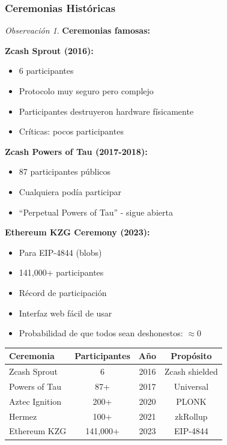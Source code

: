 \documentclass[11pt,a4paper,twoside,openright]{book}
\theoremstyle{definition}
\theoremstyle{plain}
\theoremstyle{remark}
\newtheorem{remark}{Observación}[chapter]
\begin{document}
\subsubsection{Ceremonias Históricas}

\begin{remark}
\textbf{Ceremonias famosas:}

\textbf{Zcash Sprout (2016):}
\begin{itemize}
    \item 6 participantes
    \item Protocolo muy seguro pero complejo
    \item Participantes destruyeron hardware físicamente
    \item Críticas: pocos participantes
\end{itemize}

\textbf{Zcash Powers of Tau (2017-2018):}
\begin{itemize}
    \item 87 participantes públicos
    \item Cualquiera podía participar
    \item ``Perpetual Powers of Tau'' - sigue abierta
\end{itemize}

\textbf{Ethereum KZG Ceremony (2023):}
\begin{itemize}
    \item Para EIP-4844 (blobs)
    \item 141,000+ participantes
    \item Récord de participación
    \item Interfaz web fácil de usar
    \item Probabilidad de que todos sean deshonestos: $\approx 0$
\end{itemize}

\begin{center}
\begin{tabular}{lccc}
\toprule
\textbf{Ceremonia} & \textbf{Participantes} & \textbf{Año} & \textbf{Propósito} \\
\midrule
Zcash Sprout & 6 & 2016 & Zcash shielded \\
Powers of Tau & 87+ & 2017 & Universal \\
Aztec Ignition & 200+ & 2020 & PLONK \\
Hermez & 100+ & 2021 & zkRollup \\
Ethereum KZG & 141,000+ & 2023 & EIP-4844 \\
\bottomrule
\end{tabular}
\end{center}
\end{remark}
\end{document}
